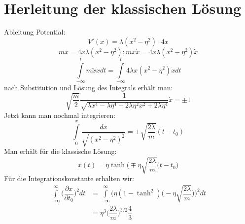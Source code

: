 \documentclass[a4paper,parskip=half,10pt]{scrartcl}
\begin{document}
\section{Herleitung der klassischen Lösung}
Ableitung Potential:
\begin{equation}
V'(x)=\lambda (x^2-\eta^2)\cdot 4x
\end{equation}
\begin{equation}
m\ddot{x}=4x\lambda(x^2-\eta^2);    m\ddot{x}\dot{x}=4x\lambda (x^2-\eta^2)\dot{x}
\end{equation}
\begin{equation}
\int \limits_{-\infty}^{t} m\ddot{x}\dot{x}dt=\int \limits_{-\infty}^{t}4\lambda x(x^2-\eta^2)\dot{x}dt
\end{equation}
nach Substitution und Lösung des Integrals erhält man:
\begin{equation}
\sqrt{\dfrac{m}{2}}\dfrac{1}{\sqrt{\lambda x^4-\lambda \eta^4-2\lambda\eta^2 x^2+2\lambda\eta^4}}\dot{x}=\pm 1
\end{equation}
Jetzt kann man nochmal integrieren:
\begin{equation}
\int \limits_{0}^{x}\dfrac{dx}{\sqrt{(x^2-\eta^2)^2}}=\pm \sqrt{\dfrac{2\lambda}{m}}(t-t_{0})
\end{equation}
Man erhält für die klassische Lösung:
\begin{equation}
x(t)=\eta \tanh\biggl(\mp \eta \sqrt{\dfrac{2\lambda}{m}}(t-t_{0}\biggr)
\end{equation}
Für die Integrationskonstante erhalten wir:
\begin{align}
\int \limits_{-\infty}^{\infty}\biggl(\dfrac{\partial x}{\partial t_{0}}\biggr)^2dt&=\int \limits_{-\infty}^{\infty}\biggl(\eta(1-\tanh^2)\biggl(-\eta \sqrt{\dfrac{2\lambda}{m}}\biggr)\biggr)^2dt\\
&=\eta^3\biggl(\dfrac{2\lambda}{m}\biggr)^{3/2}\dfrac{4}{3}
\end{align}
\end{document}
